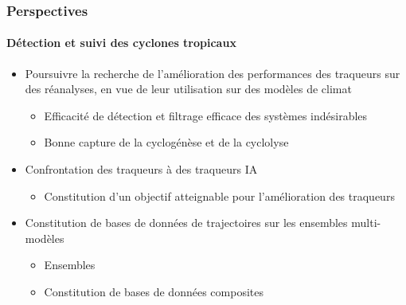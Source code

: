 \documentclass[aspectratio=169, usepdftitle=false, xcolor={dvipsnames}, 9pt,table]{beamer}
\begin{document}
\begin{frame}[c]
    \frametitle{Perspectives}
    \framesubtitle{Détection et suivi des cyclones tropicaux}
    \begin{block}
        \small
        \begin{itemize}
            \setlength{\itemsep}{2ex}
            \item<1-> Poursuivre la recherche de l'amélioration des performances des traqueurs sur des réanalyses, en vue de leur utilisation sur des modèles de
                climat
                \begin{itemize}
                    \item Efficacité de détection et filtrage efficace des systèmes indésirables
                    \item Bonne capture de la cyclogénèse et de la cyclolyse
                \end{itemize}
            \item<2-> Confrontation des traqueurs  à des traqueurs IA
                \begin{itemize}
                    \item Constitution d'un objectif atteignable pour l'amélioration des traqueurs
                \end{itemize}
            \item<3-> Constitution de bases de données  de trajectoires sur les ensembles multi-modèles 
                \begin{itemize}
                    \item Ensembles 
                    \item Constitution de bases de données composites
                \end{itemize}
        \end{itemize}
    \end{block}
\end{frame}
\end{document}

